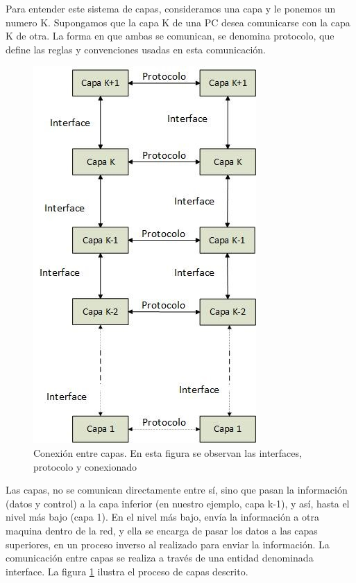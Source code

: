 Para entender este sistema de capas, consideramos una capa y le ponemos un numero K. Supongamos que la capa K de una PC desea comunicarse con la capa K de otra. La forma en que ambas se comunican, se denomina protocolo, que define las reglas y convenciones usadas en esta comunicación. 

\begin{figure}
	\centering 
	\includegraphics[scale=0.6]{modcap}
	\caption{Conexión entre capas. En esta figura se observan las interfaces, protocolo y conexionado}
	\label{fig:modOSI}	
\end{figure}
Las capas, no se comunican directamente entre sí, sino que pasan la información (datos y control) a la capa inferior (en nuestro ejemplo, capa k-1), y así, hasta el nivel más bajo (capa 1). En el nivel más bajo, envía la información a otra maquina dentro de la red, y ella se encarga de pasar los datos a las capas superiores, en un proceso inverso al realizado para enviar la información. La comunicación entre capas se realiza a través de una entidad denominada interface. La figura  \ref{fig:modOSI} ilustra el proceso de capas descrito.

